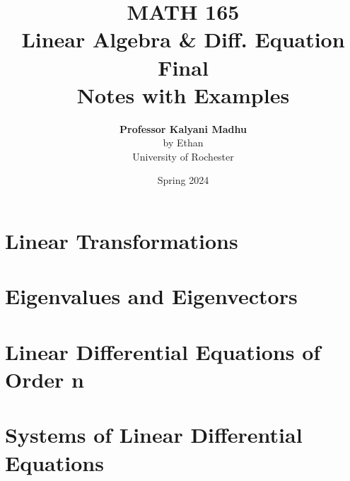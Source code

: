 \documentclass[oneside]{book}
\def\notetitle{MATH 165\\Linear Algebra \& Diff. Equation\\Final \\Notes with Examples}
\def\noteauthor{
    \textbf{Professor Kalyani Madhu} \\ 
    by Ethan\\
    University of Rochester}
\def\notedate{Spring 2024}
\begin{document}
\title{\textbf{
    \LARGE{\notetitle} \vspace*{10\baselineskip}}
    }
\author{\noteauthor}
\date{\notedate}

\maketitle
\newpage

\tableofcontents
\newpage

\chapter{Linear Transformations}


\chapter{Eigenvalues and Eigenvectors}




\chapter{Linear Differential Equations of Order n}




\chapter{Systems of Linear Differential Equations}


\end{document}
